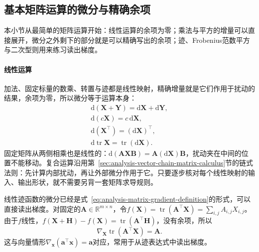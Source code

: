 \subsection{基本矩阵运算的微分与精确余项}
\label{sec:multivariable-matrix-basic-operations}

本小节从最简单的矩阵运算开始：线性运算的余项为零；乘法与平方的增量可以直接展开，微分之外剩下的部分就是可以精确写出的余项；迹、Frobenius范数平方与二次型则用来练习读出梯度。

\paragraph{线性运算}
加法、固定标量的数乘、转置与迹都是线性映射，精确增量就是它们作用于扰动的结果，余项为零，所以微分等于运算本身：
\[
 \begin{gathered}
 \mathrm d(\bm X+\bm Y)=\mathrm d\bm X+\mathrm d\bm Y,\\
 \mathrm d(c\bm X)=c\,\mathrm d\bm X,\\
 \mathrm d(\bm X^\top)=(\mathrm d\bm X)^\top,\\
 \mathrm d\operatorname{tr}\bm X=\operatorname{tr}(\mathrm d\bm X).
 \end{gathered}
\]
固定矩阵从两侧相乘也是线性的：$\mathrm d(\bm A\bm X\bm B)=\bm A(\mathrm d\bm X)\bm B$，扰动夹在中间的位置不能移动。复合运算沿用第~\ref{sec:analysis-vector-chain-matrix-calculus}节的链式法则：先计算内部扰动，再让外部微分作用于它。只要逐步核对每个线性映射的输入、输出形状，就不需要另背一套矩阵求导规则。

线性迹函数的微分已经是式~\eqref{eq:analysis-matrix-gradient-definition}的形式，可以直接读出梯度。对固定的$\bm{A}\in\mathbb{R}^{m\times n}$，令$f(\bm{X})=\operatorname{tr}(\bm{A}^{\top}\bm{X})=\sum_{i,j}A_{i,j}X_{i,j}$。由于$f$线性，$f(\bm X+\bm H)-f(\bm X)=\operatorname{tr}(\bm A^\top\bm H)$，没有余项，所以
\begin{equation}
  \nabla_{\bm{X}}\operatorname{tr}(\bm{A}^{\top}\bm{X})
  =\bm{A}.
\label{eq:analysis-trace-linear-gradient}
\end{equation}
这与向量情形$\nabla_{\bm x}(\bm a^\top\bm x)=\bm a$对应，常用于从迹表达式中读出梯度。

